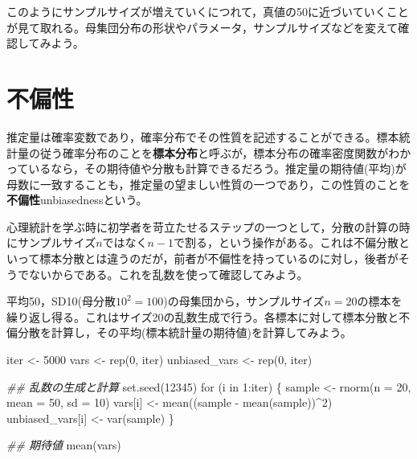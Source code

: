 \documentclass[
  a4paper,
]{ltjsbook}
\newenvironment{Shaded}{\begin{snugshade}}{\end{snugshade}}
\newcommand{\AttributeTok}[1]{\textcolor[rgb]{0.40,0.45,0.13}{#1}}
\newcommand{\ControlFlowTok}[1]{\textcolor[rgb]{0.00,0.23,0.31}{#1}}
\newcommand{\DecValTok}[1]{\textcolor[rgb]{0.68,0.00,0.00}{#1}}
\newcommand{\DocumentationTok}[1]{\textcolor[rgb]{0.37,0.37,0.37}{\textit{#1}}}
\newcommand{\FunctionTok}[1]{\textcolor[rgb]{0.28,0.35,0.67}{#1}}
\newcommand{\NormalTok}[1]{\textcolor[rgb]{0.00,0.23,0.31}{#1}}
\newcommand{\OtherTok}[1]{\textcolor[rgb]{0.00,0.23,0.31}{#1}}
\newcommand{\SpecialCharTok}[1]{\textcolor[rgb]{0.37,0.37,0.37}{#1}}
\begin{document}
このようにサンプルサイズが増えていくにつれて，真値の50に近づいていくことが見て取れる。母集団分布の形状やパラメータ，サンプルサイズなどを変えて確認してみよう。

\section{不偏性}\label{ux4e0dux504fux6027}

推定量は確率変数であり，確率分布でその性質を記述することができる。標本統計量の従う確率分布のことを\textbf{標本分布}と呼ぶが，標本分布の確率密度関数がわかっているなら，その期待値や分散も計算できるだろう。推定量の期待値(平均)が母数に一致することも，推定量の望ましい性質の一つであり，この性質のことを\textbf{不偏性}unbiasednessという。

心理統計を学ぶ時に初学者を苛立たせるステップの一つとして，分散の計算の時にサンプルサイズ\(n\)ではなく\(n-1\)で割る，という操作がある。これは不偏分散といって標本分散とは違うのだが，前者が不偏性を持っているのに対し，後者がそうでないからである。これを乱数を使って確認してみよう。

平均50，SD10(母分散\(10^2=100\))の母集団から，サンプルサイズ\(n=20\)の標本を繰り返し得る。これはサイズ20の乱数生成で行う。各標本に対して標本分散と不偏分散を計算し，その平均(標本統計量の期待値)を計算してみよう。

\begin{Shaded}
\begin{Highlighting}[]
\NormalTok{iter }\OtherTok{\textless{}{-}} \DecValTok{5000}
\NormalTok{vars }\OtherTok{\textless{}{-}} \FunctionTok{rep}\NormalTok{(}\DecValTok{0}\NormalTok{, iter)}
\NormalTok{unbiased\_vars }\OtherTok{\textless{}{-}} \FunctionTok{rep}\NormalTok{(}\DecValTok{0}\NormalTok{, iter)}

\DocumentationTok{\#\# 乱数の生成と計算}
\FunctionTok{set.seed}\NormalTok{(}\DecValTok{12345}\NormalTok{)}
\ControlFlowTok{for}\NormalTok{ (i }\ControlFlowTok{in} \DecValTok{1}\SpecialCharTok{:}\NormalTok{iter) \{}
\NormalTok{  sample }\OtherTok{\textless{}{-}} \FunctionTok{rnorm}\NormalTok{(}\AttributeTok{n =} \DecValTok{20}\NormalTok{, }\AttributeTok{mean =} \DecValTok{50}\NormalTok{, }\AttributeTok{sd =} \DecValTok{10}\NormalTok{)}
\NormalTok{  vars[i] }\OtherTok{\textless{}{-}} \FunctionTok{mean}\NormalTok{((sample }\SpecialCharTok{{-}} \FunctionTok{mean}\NormalTok{(sample))}\SpecialCharTok{\^{}}\DecValTok{2}\NormalTok{)}
\NormalTok{  unbiased\_vars[i] }\OtherTok{\textless{}{-}} \FunctionTok{var}\NormalTok{(sample)}
\NormalTok{\}}

\DocumentationTok{\#\# 期待値}
\FunctionTok{mean}\NormalTok{(vars)}
\end{Highlighting}
\end{Shaded}
\end{document}
